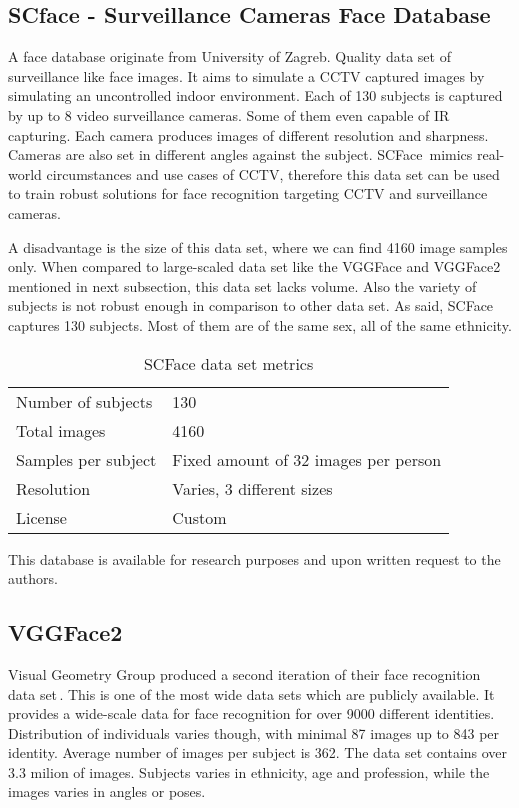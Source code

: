 \subsection{SCface - Surveillance Cameras Face Database}

A face database originate from University of Zagreb. Quality data set of surveillance like face images. It aims to simulate a CCTV captured images by simulating an uncontrolled indoor environment. Each of 130 subjects is captured by up to 8 video surveillance cameras. Some of them even capable of IR capturing. Each camera produces images of different resolution and sharpness. Cameras are also set in different angles against the subject. SCFace\,\cite{scface} mimics real-world circumstances and use cases of CCTV, therefore this data set can be used to train robust solutions for face recognition targeting CCTV and surveillance cameras.

A disadvantage is the size of this data set, where we can find \num{4160} image samples only. When compared to large-scaled data set like the VGGFace and VGGFace2 mentioned in next subsection, this data set lacks volume. Also the variety of subjects is not robust enough in comparison to other data set. As said, SCFace captures 130 subjects. Most of them are of the same sex, all of the same ethnicity.

\begin{table}[ht]
    \centering
    \caption{SCFace data set metrics}

    \begin{tabularx}{0.75\textwidth}{l|l}
        \toprule
        Number of subjects & 130 \\
        Total images & \num{4160} \\
        Samples per subject & Fixed amount of 32 images per person \\
        Resolution & Varies, 3 different sizes \\
        License & Custom \\
        \bottomrule
    \end{tabularx}
\end{table}

This database is available for research purposes and upon written request to the authors.

\subsection{VGGFace2}

Visual Geometry Group produced a second iteration of their face recognition data set\,\cite{VVGFace2}. This is one of the most wide data sets which are publicly available. It provides a wide-scale data for face recognition for over 9000 different identities. Distribution of individuals varies though, with minimal 87 images up to 843 per identity. Average number of images per subject is 362. The data set contains over \num{3.3} milion of images. Subjects varies in ethnicity, age and profession, while the images varies in angles or poses.

